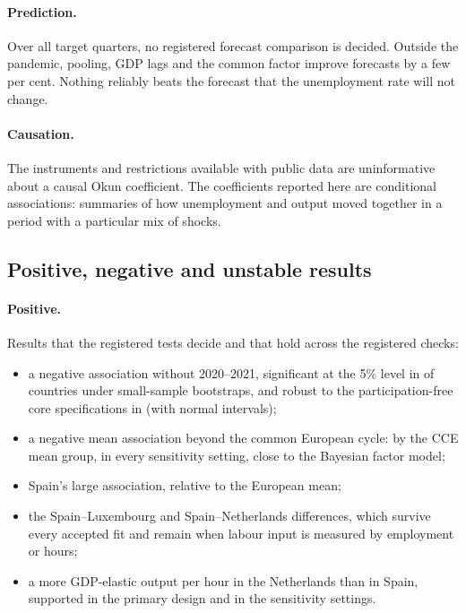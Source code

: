 \paragraph{Prediction.} Over all target quarters, no registered forecast comparison is
decided. Outside the pandemic, pooling, GDP lags and the common factor improve forecasts
by a few per cent. Nothing reliably beats the forecast that the unemployment rate will not
change.

\paragraph{Causation.} The instruments and restrictions available with public data are
uninformative about a causal Okun coefficient. The coefficients reported here are
conditional associations: summaries of how unemployment and output moved together in a
period with a particular mix of shocks.

\subsection{Positive, negative and unstable results}

\paragraph{Positive.} Results that the registered tests decide and that hold across the
registered checks:
\begin{itemize}
  \item a negative association without 2020--2021, significant at the 5\% level in
     of  countries under small-sample bootstraps, and
    robust to the participation-free core specifications in 
    (with normal intervals);
  \item a negative mean association beyond the common European cycle:  by
    the CCE mean group, in every sensitivity setting, close to the Bayesian factor model;
  \item Spain's large association, relative to the European mean;
  \item the Spain--Luxembourg and Spain--Netherlands differences, which survive every
    accepted fit and remain when labour input is measured by employment or hours;
  \item a more GDP-elastic output per hour in the Netherlands than in Spain, supported in
    the primary design and in the  sensitivity settings.
\end{itemize}

